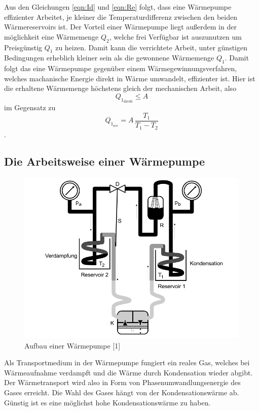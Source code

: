 Aus den Gleichungen \ref{eqn:Id} und \ref{eqn:Re} folgt, dass eine Wärmepumpe effizienter Arbeitet, je kleiner die Temperaturdifferenz
zwischen den beiden Wärmereservoirs ist. Der Vorteil einer Wärmepumpe liegt außerdem in der möglichkeit eine Wärmemenge $Q_2$, welche frei Verfügbar ist 
auszunutzen um Preisgünstig $Q_1$ zu heizen. Damit kann die verrichtete Arbeit, unter günstigen Bedingungen erheblich kleiner sein als die gewonnene Wärmemenge $Q_1$.
Damit folgt das eine Wärmepumpe gegenüber einem Wärmegewinnungsverfahren, welches machanische Energie direkt in Wärme umwandelt, effizienter ist.
Hier ist die erhaltene Wärmemenge höchstens gleich der mechanischen Arbeit, also
\begin{equation*}
    Q_{1_\text{direkt}}\leq A
\end{equation*}
im Gegensatz zu
\begin{equation*}
    Q_{1_\text{rev}}=A\,\frac{T_1}{T_1-T_2}
\end{equation*}.



\subsection{Die Arbeitsweise einer Wärmepumpe}
\begin{figure}
    \centering
    \includegraphics[scale=0.4]{aufbau.pdf}
    \caption{Aufbau einer Wärmepumpe [1]}
    \label{fig:aufbau}
\end{figure}
Als Transportmedium in der Wärmepumpe fungiert ein reales Gas,
welches bei Wärmeaufnahme verdampft und die Wärme durch Kondensation wieder abgibt. Der Wärmetransport wird also in Form 
von Phasenumwandlungsenergie des Gases erreicht.
Die Wahl des Gases hängt von der Kondensationswärme ab. Günstig ist es eine möglichst hohe Kondensationswärme zu haben. 

